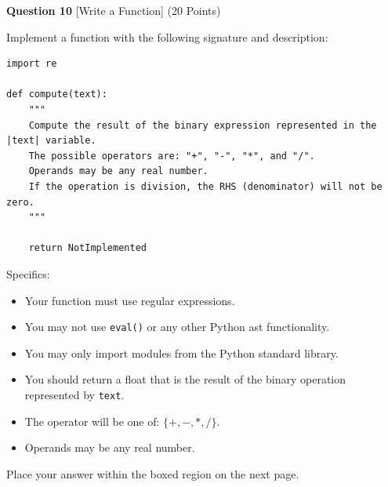 \documentclass{report}
\newcommand*{\calcremainingheight}{%
    \ifdim\pagegoal=\maxdimen
        \remainingheight\dimexpr\textheight-0.4pt\relax
    \else
        \remainingheight\dimexpr\pagegoal-\pagetotal-\lineskip-0.4pt\relax
    \fi
}
\begin{document}
\begin{minipage}{\textwidth}
    \noindent
        \textbf{Question 10} [Write a Function] (20 Points)
    \vspace{0.25cm}

    \noindent
    Implement a function with the following signature and description:

\begin{lstlisting}
import re

def compute(text):
    """
    Compute the result of the binary expression represented in the |text| variable.
    The possible operators are: "+", "-", "*", and "/".
    Operands may be any real number.
    If the operation is division, the RHS (denominator) will not be zero.
    """

    return NotImplemented
\end{lstlisting}

Specifics:

\begin{itemize}
    \item Your function must use regular expressions.
    \item You may not use \verb|eval()| or any other Python ast functionality.
    \item You may only import modules from the Python standard library.
    \item You should return a float that is the result of the binary operation represented by \verb|text|.
    \item The operator will be one of:  $ \{+, -, *, /\} $.
    \item Operands may be any real number.
\end{itemize}

    \vspace{0.25cm}

    Place your answer within the boxed region on the next page.

        \vspace{0.25cm}


    \end{minipage}
    \newpage
    \begin{minipage}{\textwidth}

        \begin{center}

    \calcremainingheight

        \end{center}
\end{minipage}




\end{document}
